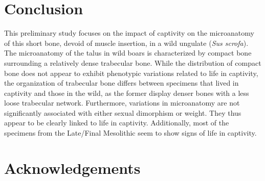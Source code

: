 \documentclass[12pt,a4paper]{article}
\begin{document}
\section{Conclusion}
This preliminary study focuses on the impact of captivity on the microanatomy of this short bone, devoid of muscle insertion, in a wild ungulate (\textit{Sus scrofa}). The microanatomy of the talus in wild boars is characterized by compact bone surrounding a relatively dense trabecular bone. While the distribution of compact bone does not appear to exhibit phenotypic variations related to life in captivity, the organization of trabecular bone differs between specimens that lived in captivity and those in the wild, as the former display denser bones with a less loose trabecular network. Furthermore, variations in microanatomy are not significantly associated with either sexual dimorphism or weight. They thus appear to be clearly linked to life in captivity. Additionally, most of the specimens from the 
Late/Final Mesolithic seem to show signs of life in captivity. 
\section{Acknowledgements}


 
 
\end{document}

